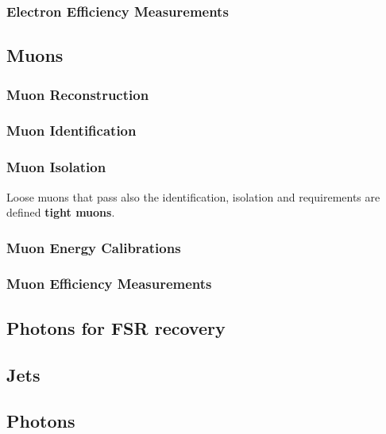 \subsubsection{Electron Efficiency Measurements}
\label{sec:eleEffMeas}

\subsection{Muons}
\subsubsection{Muon Reconstruction}
\label{sec:muonReco}

\subsubsection{Muon Identification}
\label{sec:muonID}

\subsubsection{Muon Isolation}
\label{sec:muoniso}


Loose muons that pass also the identification, isolation and \SIPthreeD requirements are defined \textbf{tight muons}.

\subsubsection{Muon Energy Calibrations}

\subsubsection{Muon Efficiency Measurements}
\label{sec:muonEffMeas}

%
\subsection{Photons for FSR recovery}
\label{sec:FSRphotons}

\subsection{Jets}
\label{sec:jets}


\subsection{Photons}
\label{sec:photons}


